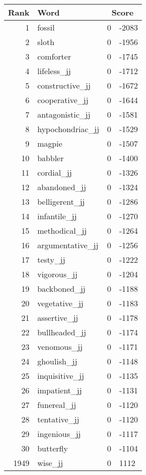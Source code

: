 \begin{longtable}[!htbp]{| rlr@{.}l |}
    \hline
    \textbf{Rank} & \textbf{Word} & \multicolumn{2}{c|}{\textbf{Score}} \\
    \hline
    \endhead
    1 & fossil & 0 & -2083 \\
    2 & sloth & 0 & -1956 \\
    3 & comforter & 0 & -1745 \\
    4 & lifeless\_jj & 0 & -1712 \\
    5 & constructive\_jj & 0 & -1672 \\
    6 & cooperative\_jj & 0 & -1644 \\
    7 & antagonistic\_jj & 0 & -1581 \\
    8 & hypochondriac\_jj & 0 & -1529 \\
    9 & magpie & 0 & -1507 \\
    10 & babbler & 0 & -1400 \\
    11 & cordial\_jj & 0 & -1326 \\
    12 & abandoned\_jj & 0 & -1324 \\
    13 & belligerent\_jj & 0 & -1286 \\
    14 & infantile\_jj & 0 & -1270 \\
    15 & methodical\_jj & 0 & -1264 \\
    16 & argumentative\_jj & 0 & -1256 \\
    17 & testy\_jj & 0 & -1222 \\
    18 & vigorous\_jj & 0 & -1204 \\
    19 & backboned\_jj & 0 & -1188 \\
    20 & vegetative\_jj & 0 & -1183 \\
    21 & assertive\_jj & 0 & -1178 \\
    22 & bullheaded\_jj & 0 & -1174 \\
    23 & venomous\_jj & 0 & -1171 \\
    24 & ghoulish\_jj & 0 & -1148 \\
    25 & inquisitive\_jj & 0 & -1135 \\
    26 & impatient\_jj & 0 & -1131 \\
    27 & funereal\_jj & 0 & -1120 \\
    28 & tentative\_jj & 0 & -1120 \\
    29 & ingenious\_jj & 0 & -1117 \\
    30 & butterfly & 0 & -1104 \\
    1949 & wise\_jj & 0 & 1112 \\

\end{longtable}

